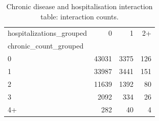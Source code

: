 \begin{table}
\caption{Chronic disease and hospitalisation interaction table: interaction counts.}
\label{tab:02-interaction-counts}
\begin{tabular}{lrrr}
\toprule
hospitalizations_grouped & 0 & 1 & 2+ \\
chronic_count_grouped &  &  &  \\
\midrule
0 & 43031 & 3375 & 126 \\
1 & 33987 & 3441 & 151 \\
2 & 11639 & 1392 & 80 \\
3 & 2092 & 334 & 26 \\
4+ & 282 & 40 & 4 \\
\bottomrule
\end{tabular}
\end{table}

